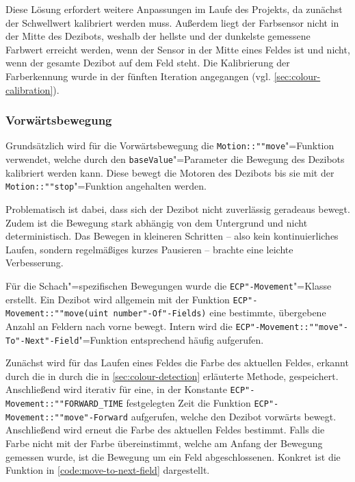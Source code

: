 Diese Lösung erfordert weitere Anpassungen im Laufe des Projekts, da zunächst der Schwellwert kalibriert werden muss. Außerdem liegt der Farbsensor nicht in der Mitte des Dezibots, weshalb der hellste und der dunkelste gemessene Farbwert erreicht werden, wenn der Sensor in der Mitte eines Feldes ist und nicht, wenn der gesamte Dezibot auf dem Feld steht. Die Kalibrierung der Farberkennung wurde in der fünften Iteration angegangen (vgl. \autoref{sec:colour-calibration}).


\subsubsection{Vorwärtsbewegung}
\label{sec:move-straight}

Grundsätzlich wird für die Vorwärtsbewegung die \texttt{Motion::""move}"=Funktion verwendet, welche durch den \texttt{baseValue}"=Parameter die Bewegung des Dezibots kalibriert werden kann. Diese bewegt die Motoren des Dezibots bis sie mit der \texttt{Motion::""stop}"=Funktion angehalten werden.

Problematisch ist dabei, dass sich der Dezibot nicht zuverlässig geradeaus bewegt. Zudem ist die Bewegung stark abhängig von dem Untergrund und nicht deterministisch. Das Bewegen in kleineren Schritten -- also kein kontinuierliches Laufen, sondern regelmäßiges kurzes Pausieren -- brachte eine leichte Verbesserung. 

Für die Schach"=spezifischen Bewegungen wurde die \texttt{ECP"-Movement}"=Klasse erstellt. Ein Dezibot wird allgemein mit der Funktion \texttt{ECP"-Movement::""move(uint number"-Of"-Fields)} eine bestimmte, übergebene Anzahl an Feldern nach vorne bewegt. Intern wird die \texttt{ECP"-Movement::""move"-To"-Next"-Field}"=Funktion entsprechend häufig aufgerufen.

Zunächst wird für das Laufen eines Feldes die Farbe des aktuellen Feldes, erkannt durch die in durch die in \autoref{sec:colour-detection} erläuterte Methode, gespeichert. Anschließend wird iterativ für eine, in der Konstante \texttt{ECP"-Movement::""FORWARD\_TIME} festgelegten Zeit die Funktion \texttt{ECP"-Movement::""move"-Forward} aufgerufen, welche den Dezibot vorwärts bewegt. Anschließend wird erneut die Farbe des aktuellen Feldes bestimmt. Falls die Farbe nicht mit der Farbe übereinstimmt, welche am Anfang der Bewegung gemessen wurde, ist die Bewegung um ein Feld abgeschlossenen. Konkret ist die Funktion in \autoref{code:move-to-next-field} dargestellt.

